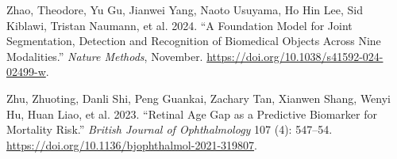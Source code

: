 \documentclass[
  Letterpaper,
]{scrbook}
\newlength{\cslhangindent}
\newenvironment{CSLReferences}[2] %
 {\begin{list}{}{%
  \setlength{\itemindent}{0pt}
  \setlength{\leftmargin}{0pt}
  \setlength{\parsep}{0pt}
  \ifodd #1
   \setlength{\leftmargin}{\cslhangindent}
   \setlength{\itemindent}{-1\cslhangindent}
  \fi
  \setlength{\itemsep}{#2\baselineskip}}}
 {\end{list}}
\begin{document}
\begin{CSLReferences}{1}{0}
Zhao, Theodore, Yu Gu, Jianwei Yang, Naoto Usuyama, Ho Hin Lee, Sid
Kiblawi, Tristan Naumann, et al. 2024. {``A Foundation Model for Joint
Segmentation, Detection and Recognition of Biomedical Objects Across
Nine Modalities.''} \emph{Nature Methods}, November.
\url{https://doi.org/10.1038/s41592-024-02499-w}.

Zhu, Zhuoting, Danli Shi, Peng Guankai, Zachary Tan, Xianwen Shang,
Wenyi Hu, Huan Liao, et al. 2023. {``Retinal Age Gap as a Predictive
Biomarker for Mortality Risk.''} \emph{British Journal of Ophthalmology}
107 (4): 547--54.
\url{https://doi.org/10.1136/bjophthalmol-2021-319807}.

\end{CSLReferences}


\backmatter
\end{document}
